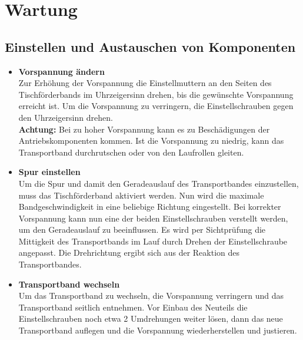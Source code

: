 %
%

\chapter{Wartung}

\section{Einstellen und Austauschen von Komponenten} 
\label{sec:einstellen}

\begin{itemize}
	
	\item \textbf{Vorspannung ändern} \\
	Zur Erhöhung der Vorspannung die Einstellmuttern an den Seiten des Tischförderbands im Uhrzeigersinn drehen, bis die gewünschte Vorspannung erreicht ist. Um die Vorspannung zu verringern, die Einstellschrauben gegen den Uhrzeigersinn drehen.\\
	\textbf{Achtung:} Bei zu hoher Vorspannung kann es zu Beschädigungen der Antriebskomponenten kommen. Ist die Vorspannung zu niedrig, kann das Transportband durchrutschen oder von den Laufrollen gleiten.
	
	\item \textbf{Spur einstellen} \\
	Um die Spur und damit den Geradeauslauf des Transportbandes einzustellen, muss das Tischförderband aktiviert werden. Nun wird die maximale Bandgeschwindigkeit in eine beliebige Richtung eingestellt. Bei korrekter Vorspannung kann nun eine der beiden Einstellschrauben verstellt werden, um den Geradeauslauf zu beeinflussen. Es wird per Sichtprüfung die Mittigkeit des Transportbands im Lauf durch Drehen der Einstellschraube angepasst. Die Drehrichtung ergibt sich aus der Reaktion des Transportbandes.
	
	\item \textbf{Transportband wechseln} \\
	Um das Transportband zu wechseln, die Vorspannung verringern und das Transportband seitlich entnehmen. Vor Einbau des Neuteils die Einstellschrauben noch etwa 2 Umdrehungen weiter lösen, dann das neue Transportband auflegen und die Vorspannung wiederherstellen und justieren.
	
\end{itemize}



